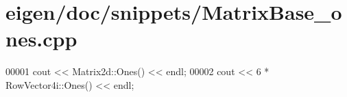 \hypertarget{eigen_2doc_2snippets_2_matrix_base__ones_8cpp_source}{}\section{eigen/doc/snippets/\+Matrix\+Base\+\_\+ones.cpp}
\label{eigen_2doc_2snippets_2_matrix_base__ones_8cpp_source}

\begin{DoxyCode}
00001 cout << Matrix2d::Ones() << endl;
00002 cout << 6 * RowVector4i::Ones() << endl;
\end{DoxyCode}

